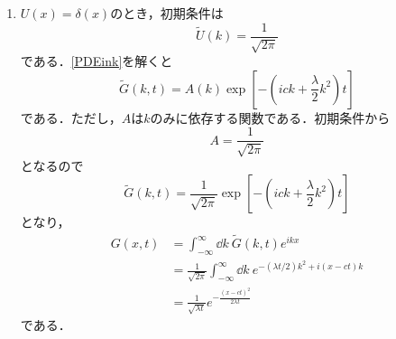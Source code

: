 \documentclass[a4paper,pdflatex,ja=standard]{bxjsarticle}
\begin{document}
\begin{enumerate}
\begin{enumerate}
    \item
    $U(x)=\delta (x)$のとき，初期条件は
    \begin{equation}
      \tilde{U}(k)
      =
      \frac{1}{\sqrt{2\pi}}
    \end{equation}
    である．\eqref{PDEink}を解くと
    \begin{equation}
      \tilde{G}(k,t)
      =
      A(k)\exp\left[ -\left( ick+\frac{\lambda}{2}k^2 \right)t \right]
      \label{solink}
    \end{equation}
    である．ただし，$A$は$k$のみに依存する関数である．初期条件から
    \begin{equation}
      A
      =
      \frac{1}{\sqrt{2\pi}}
    \end{equation}
    となるので
    \begin{equation}
      \tilde{G}(k,t)
      =
      \frac{1}{\sqrt{2\pi}}\exp\left[ -\left( ick+\frac{\lambda}{2}k^2 \right)t \right]
    \end{equation}
    となり，
    \begin{align}
      G(x,t)
      &=
      \int_{-\infty}^{\infty}\dd k\ \tilde{G}(k,t)e^{ikx}
      \nonumber
      \\
      &=
      \frac{1}{\sqrt{2\pi}}\int_{-\infty}^{\infty}\dd k\ e^{-(\lambda t/2)k^2+i(x-ct)k}
      \nonumber
      \\
      &=
      \frac{1}{\sqrt{\lambda t}}e^{-\tfrac{(x-ct)^2}{2\lambda t}}
    \end{align}
    である．


\end{enumerate}
\end{enumerate}
\end{document}
